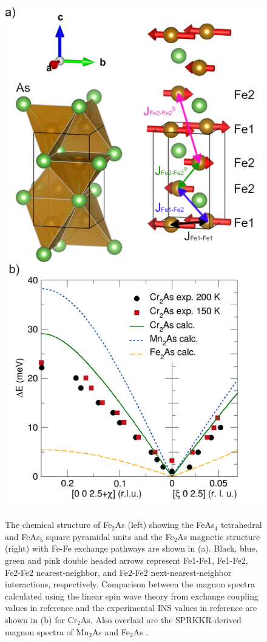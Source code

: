 \documentclass[10pt,doublespacing,edeposit]{uiucthesis2020}
\begin{document}
\begin{mainmatter}
\begin{figure}
\centering\includegraphics[width=0.65\columnwidth]{figures/ch8/Cr2As_INS_magnetic_structure.png} \\
\caption{\label{fig:Cr2As_plot}
The chemical structure of Fe$_2$As (left) showing the FeAs$_4$ tetrahedral and FeAs$_5$ square pyramidal units and the Fe$_2$As magnetic structure (right) with Fe-Fe exchange pathways are shown in (a). Black, blue, green and pink double headed arrows represent Fe1-Fe1, Fe1-Fe2, Fe2-Fe2 nearest-neighbor, and Fe2-Fe2 next-nearest-neighbor interactions, respectively. Comparison between the magnon spectra calculated using the linear spin wave theory from exchange coupling values in reference  and the experimental INS values in reference  are shown in (b) for Cr$_2$As. Also overlaid are the SPRKKR-derived magnon spectra of Mn$_2$As and Fe$_2$As \cite{Zhang2013}. 
} 
\end{figure}


\end{mainmatter}
\end{document}

